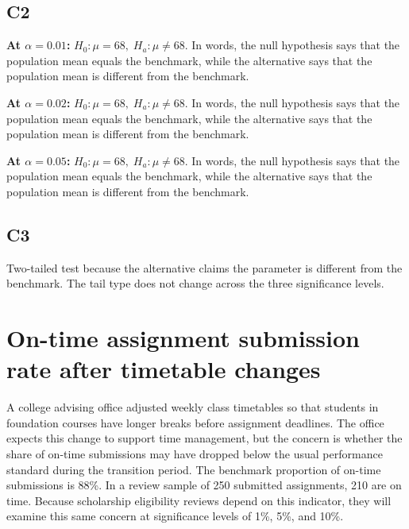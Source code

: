\begin{ExamProblems}
		\subsection*{C2}
		\textbf{At \(\alpha=0.01\):} \(H_0\colon \mu=68,\; H_a\colon \mu\ne 68\). In words, the null hypothesis says that the population mean equals the benchmark, while the alternative says that the population mean is different from the benchmark.
		
		\textbf{At \(\alpha=0.02\):} \(H_0\colon \mu=68,\; H_a\colon \mu\ne 68\). In words, the null hypothesis says that the population mean equals the benchmark, while the alternative says that the population mean is different from the benchmark.
		
		\textbf{At \(\alpha=0.05\):} \(H_0\colon \mu=68,\; H_a\colon \mu\ne 68\). In words, the null hypothesis says that the population mean equals the benchmark, while the alternative says that the population mean is different from the benchmark.
		
		\subsection*{C3}
		Two-tailed test because the alternative claims the parameter is different from the benchmark. The tail type does not change across the three significance levels.\TwoTailGraph
		

		\item
		\section{On-time assignment submission rate after timetable changes}
		A college advising office adjusted weekly class timetables so that students in foundation courses have longer breaks before assignment deadlines. The office expects this change to support time management, but the concern is whether the share of on-time submissions may have dropped below the usual performance standard during the transition period. The benchmark proportion of on-time submissions is 88\%. In a review sample of 250 submitted assignments, 210 are on time. Because scholarship eligibility reviews depend on this indicator, they will examine this same concern at significance levels of 1\%, 5\%, and 10\%.
		

\end{ExamProblems}
